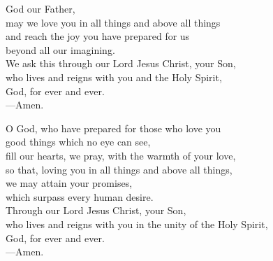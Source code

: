 \prayer


\begin{prayerverse}
God our Father,\\
may we love you in all things and above all things\\
and reach the joy you have prepared for us\\
beyond all our imagining.\\
We ask this through our Lord Jesus Christ, your Son,\\
who lives and reigns with you and the Holy Spirit,\\
God, for ever and ever.\\
{\color{red}---\thinspace}Amen.
\end{prayerverse}


\begin{prayerverse}
O God, who have prepared for those who love you\\
good things which no eye can see,\\
fill our hearts, we pray, with the warmth of your love,\\
so that, loving you in all things and above all things,\\
we may attain your promises,\\
which surpass every human desire.\\
Through our Lord Jesus Christ, your Son,\\
who lives and reigns with you in the unity of the Holy Spirit,\\
God, for ever and ever.\\
{\color{red}---\thinspace}Amen.
\end{prayerverse}

